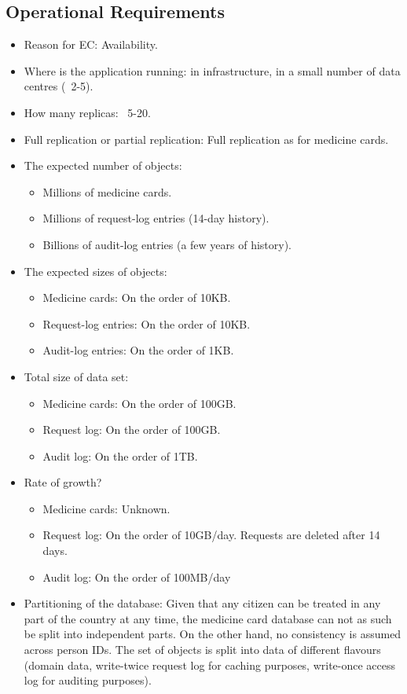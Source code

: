 \documentclass[11pt,a4paper]{report}
\begin{document}
\subsection{Operational Requirements}
\begin{itemize}
\item Reason for EC: Availability.
\item Where is the application running: in infrastructure, in a small number of data centres (~2-5).
\item How many replicas: ~5-20.
\item Full replication or partial replication: Full replication as for medicine cards.
\item The expected number of objects:
\begin{itemize}
\item Millions of medicine cards.
\item Millions of request-log entries (14-day history).
\item Billions of audit-log entries (a few years of history).
\end{itemize}
\item The expected sizes of objects:
\begin{itemize}
\item Medicine cards: On the order of 10KB.
\item Request-log entries: On the order of 10KB.
\item Audit-log entries: On the order of 1KB.
\end{itemize}
\item Total size of data set:    
\begin{itemize}
\item Medicine cards: On the order of 100GB.
\item Request log: On the order of 100GB.
\item Audit log: On the order of 1TB.
\end{itemize}
\item Rate of growth?
\begin{itemize}
\item Medicine cards: Unknown.
\item Request log: On the order of 10GB/day. Requests are deleted after 14 days.
\item Audit log: On the order of 100MB/day
\end{itemize}
\end{itemize}
\begin{itemize}
\item Partitioning of the database:
Given that any citizen can be treated in any part of the country at any time, the medicine card database can not as such be split into independent parts. On the other hand, no consistency is assumed across person IDs.
The set of objects is split into data of different flavours (domain data, write-twice request log for caching purposes, write-once access log for auditing purposes).
\end{itemize}
\end{document}

